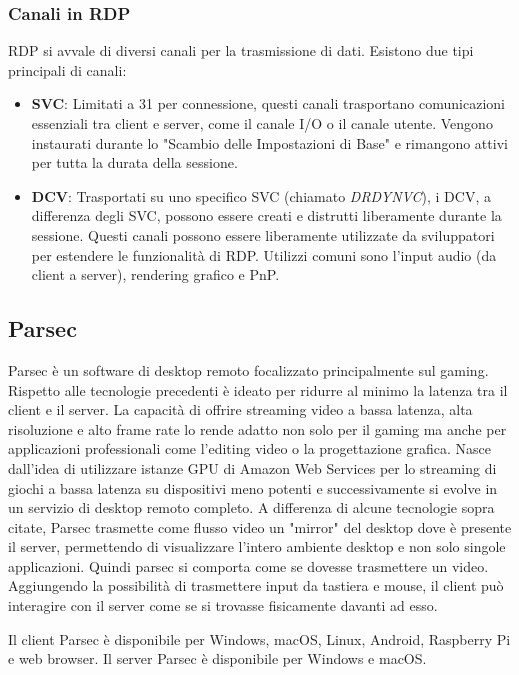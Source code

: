 \documentclass[12pt,a4paper,openright,twoside]{book}
\begin{document}
\subsubsection{Canali in RDP}
\ac{RDP} si avvale di diversi canali per la trasmissione di dati. Esistono due tipi principali di canali:
\begin{itemize}
    \item \textbf{\ac{SVC}}: Limitati a 31 per connessione,
    questi canali trasportano comunicazioni essenziali tra client e server, come il canale I/O o il canale utente. Vengono instaurati durante lo "Scambio delle Impostazioni di Base" e rimangono attivi per tutta la durata della sessione.
    \item \textbf{\ac{DCV}}: Trasportati su uno specifico \ac{SVC} (chiamato \emph{DRDYNVC}),
    i \ac{DCV}, a differenza degli \ac{SVC},
    possono essere creati e distrutti liberamente durante la sessione.
    Questi canali possono essere liberamente utilizzate da sviluppatori per estendere le funzionalità di \ac{RDP}.
    Utilizzi comuni sono l'input audio (da client a server), rendering grafico e PnP.
\end{itemize}

\subsection{Parsec}
Parsec è un software di desktop remoto focalizzato principalmente sul gaming. Rispetto alle tecnologie precedenti è ideato per ridurre al minimo la latenza tra il client e il server.
La capacità di offrire streaming video a bassa latenza, alta risoluzione e alto frame rate lo rende adatto non solo per il gaming ma anche per applicazioni professionali come l'editing video o la progettazione grafica.
Nasce dall'idea di utilizzare istanze GPU di Amazon Web Services per lo streaming di giochi a bassa latenza su dispositivi meno potenti e successivamente si evolve in un servizio di desktop remoto completo.
%
A differenza di alcune tecnologie sopra citate,
Parsec trasmette come flusso video un "mirror" del desktop dove è presente il server,
permettendo di visualizzare l'intero ambiente desktop e non solo singole applicazioni. Quindi parsec si comporta come se dovesse trasmettere un video.
Aggiungendo la possibilità di trasmettere input da tastiera e mouse, il client può interagire con il server come se si trovasse fisicamente davanti ad esso.

Il client Parsec è disponibile per Windows, macOS, Linux, Android, Raspberry Pi e web browser. Il server Parsec è disponibile per Windows e macOS. 
\end{document}
